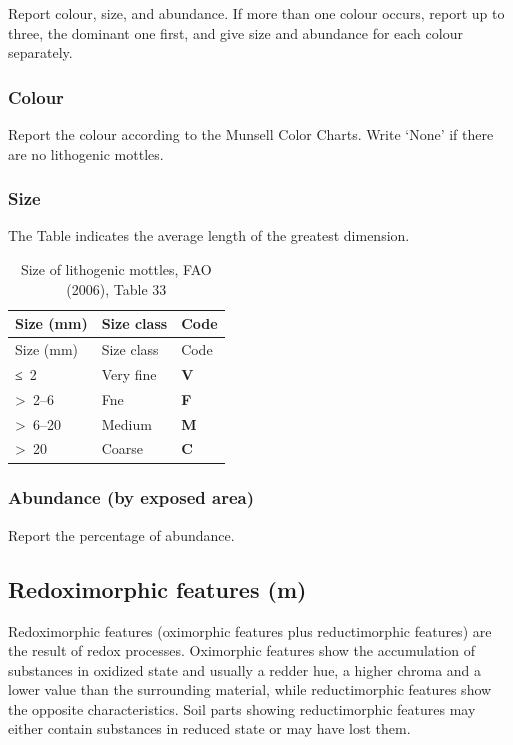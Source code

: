 \documentclass[
  letterpaper,
  DIV=11,
  numbers=noendperiod]{scrreprt}
\begin{document}
Report colour, size, and abundance. If more than one colour occurs,
report up to three, the dominant one first, and give size and abundance
for each colour separately.

\hypertarget{colour}{%
\subsubsection{Colour}\label{colour}}

Report the colour according to the Munsell Color Charts. Write `None' if
there are no lithogenic mottles.

\hypertarget{size-2}{%
\subsubsection{Size}\label{size-2}}

The Table indicates the average length of the greatest dimension.

\begin{longtable}[]{@{}lll@{}}
\caption{Size of lithogenic mottles, FAO (2006), Table
33}\tabularnewline
\toprule()
Size (mm) & Size class & Code \\
\midrule()
\endfirsthead
\toprule()
Size (mm) & Size class & Code \\
\midrule()
\endhead
≤~2 & Very fine & \textbf{V} \\
\textgreater~2--6 & Fne & \textbf{F} \\
\textgreater~6--20 & Medium & \textbf{M} \\
\textgreater~20 & Coarse & \textbf{C} \\
\bottomrule()
\end{longtable}

\hypertarget{abundance-by-exposed-area}{%
\subsubsection{Abundance (by exposed
area)}\label{abundance-by-exposed-area}}

Report the percentage of abundance.

\hypertarget{redoximorphic-features-m}{%
\subsection{Redoximorphic features (m)}\label{redoximorphic-features-m}}

Redoximorphic features (oximorphic features plus reductimorphic
features) are the result of redox processes. Oximorphic features show
the accumulation of substances in oxidized state and usually a redder
hue, a higher chroma and a lower value than the surrounding material,
while reductimorphic features show the opposite characteristics. Soil
parts showing reductimorphic features may either contain substances in
reduced state or may have lost them.
\end{document}
